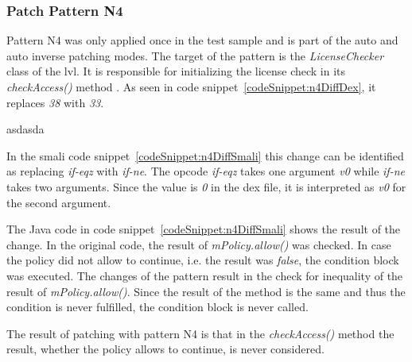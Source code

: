 \subsubsection{Patch Pattern N4}
Pattern N4 was only applied once in the test sample and is part of the auto and auto inverse patching modes.
The target of the pattern is the \textit{LicenseChecker} class of the \gls{lvl}.
It is responsible for initializing the license check in its \textit{checkAccess()} method \cite{developersLicensingReference}.
\newline
As seen in code snippet~\ref{codeSnippet:n4DiffDex}, it replaces \textit{38} with \textit{33}.
\newline

asdasda
\newline

In the smali code snippet~\ref{codeSnippet:n4DiffSmali} this change can be identified as replacing \textit{if-eqz} with \textit{if-ne}.
The opcode \textit{if-eqz} takes one argument \textit{v0} while \textit{if-ne} takes two arguments.
Since the value is \textit{0} in the \gls{dex} file, it is interpreted as \textit{v0} for the second argument.
\newline

The Java code in code snippet~\ref{codeSnippet:n4DiffSmali} shows the result of the change.
In the original code, the result of \textit{mPolicy.allow()} was checked.
In case the policy did not allow to continue, i.e. the result was \textit{false}, the condition block was executed.
The changes of the pattern result in the check for inequality of the result of \textit{mPolicy.allow()}.
Since the result of the method is the same and thus the condition is never fulfilled, the condition block is never called.
\newline

The result of patching with pattern N4 is that in the \textit{checkAccess()} method the result, whether the policy allows to continue, is never considered.

